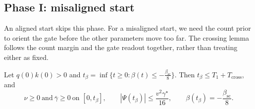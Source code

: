 \subsection{Phase I: misaligned start}

An aligned start skips this phase. For a misaligned start, we need the count prior to orient the gate before the other parameters
move too far. The crossing lemma follows the count margin and the gate readout together, rather than treating either as fixed.

\begin{lemma}[Crossing]
\label{lem:J-cross}
Let $q(0)k(0)>0$ and $t_\beta=\inf\{t\ge0:\beta(t)\le-\frac{\beta_{\mathrm{sc}}}{8}\}$. Then $t_\beta\le T_1+T_{\mathrm{cross}}$, and
\[
 \nu\ge0\ \text{and}\ \bar\gamma\ge0\ \text{on }[0,t_\beta],\qquad |\Psi(t_\beta)|\le\frac{v^2\gamma^\star}{16},\qquad \beta(t_\beta)=-\frac{\beta_{\mathrm{sc}}}{8}.
\]
\end{lemma}

